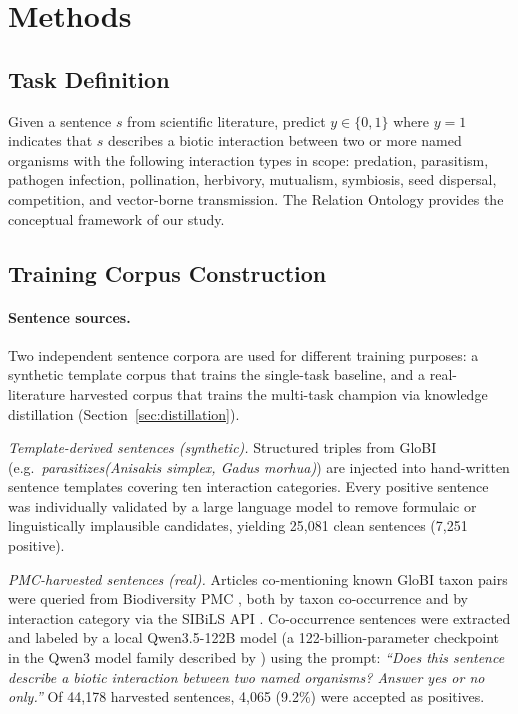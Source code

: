 \documentclass[a4paper,fleqn]{cas-sc}
\begin{document}
\section{Methods}
\label{sec:methods}

\subsection{Task Definition}

Given a sentence $s$ from scientific literature, predict $y \in \{0, 1\}$
where $y=1$ indicates that $s$ describes a biotic interaction between two
or more named organisms with the following interaction types in scope: predation, parasitism,
pathogen infection, pollination, herbivory, mutualism, symbiosis, seed
dispersal, competition, and vector-borne transmission. 
The Relation Ontology provides the conceptual framework of our study.


\subsection{Training Corpus Construction}
\label{sec:data}

\paragraph{Sentence sources.}
Two independent sentence corpora are used for different training
purposes: a synthetic template corpus that trains the single-task
baseline, and a real-literature harvested corpus that trains the
multi-task champion via knowledge distillation (Section~\ref{sec:distillation}).

\emph{Template-derived sentences (synthetic).}
Structured triples from GloBI (e.g.\ \textit{parasitizes(Anisakis simplex,
Gadus morhua)}) are injected into hand-written sentence templates covering
ten interaction categories. Every positive sentence was individually
validated by a large language model to remove formulaic or linguistically
implausible candidates, yielding 25,081 clean sentences (7,251 positive).

\emph{PMC-harvested sentences (real).}
Articles co-mentioning known GloBI taxon pairs were queried from
Biodiversity PMC \citep{biodiversitypmc2024}, both by taxon co-occurrence
and by interaction category via the SIBiLS API \citep{mottin2021sibils}.
Co-occurrence sentences were extracted and labeled by a local Qwen3.5-122B
model (a 122-billion-parameter checkpoint in the Qwen3 model family
described by \citep{qwen2025technical})
using the prompt:
\textit{``Does this sentence describe a biotic interaction between two named
organisms? Answer yes or no only.''}
Of 44,178 harvested sentences, 4,065 (9.2\%) were accepted as positives.
\end{document}
